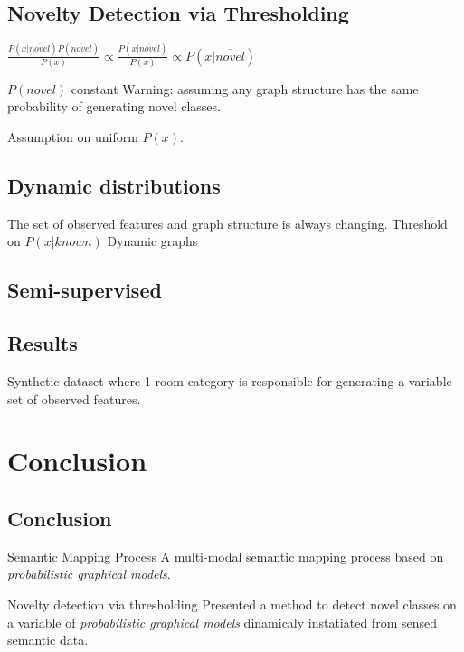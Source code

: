 \documentclass[compress]{beamer}
\begin{document}
\subsection{Novelty Detection via Thresholding}
\begin{frame}
    $\frac{P(x|\overline{novel})P(\overline{novel})}{P(x)} \propto \frac{P(x|\overline{novel})}{P(x)} \propto P(x|\overline{novel})$
    \begin{block}{$P(novel)$ constant}
        Warning: assuming any graph structure has the same probability of generating
        novel classes.
    \end{block}
    \begin{block}
        Assumption on uniform $P(x)$.
    \end{block}
\end{frame}


\subsection{Dynamic distributions}
\begin{frame}
    The set of observed features and graph structure is always changing.
    Threshold on $P(x|known)$ \cite{bishop1994novelty}
    Dynamic graphs
\end{frame}

\subsection{Semi-supervised}
\begin{frame}
    
\end{frame}

\subsection{Results}
\begin{frame}
    Synthetic dataset where 1 room category is responsible for generating a variable set of observed features.
\end{frame}

\section{Conclusion}
\subsection{Conclusion}
\begin{frame}
    \begin{block}
        {Semantic Mapping Process}
        A multi-modal semantic mapping process based on \emph{probabilistic graphical models}.
    \end{block}
    \begin{block}
        {Novelty detection via thresholding}
        Presented a method to detect novel classes on a variable of \emph{probabilistic graphical models}
        dinamicaly instatiated from sensed semantic data.
    \end{block}
\end{frame}
\end{document}
